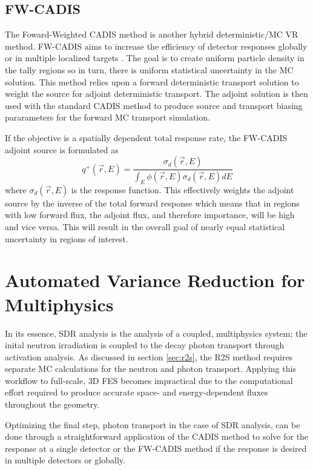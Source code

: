 \subsection{FW-CADIS}
The Foward-Weighted CADIS method is another hybrid deterministic/MC VR method.
FW-CADIS aims to increase the efficiency of 
detector responses globally or in multiple localized targets \cite{fwcadis}.
The goal is to create uniform particle density in the tally regions so in turn,
there is uniform statistical uncertainty in the MC solution.
This method relies upon a forward deterministic transport solution to
weight the source for adjoint deterministic transport.  The adjoint solution is
then used with the standard CADIS method to produce source and transport
biasing pararameters for the forward MC transport simulation.

If the objective is a spatially dependent total response rate, the FW-CADIS 
adjoint source is formulated as
\begin{equation}
	q^{+}(\overrightarrow{r}, E) = \frac{\sigma_d(\overrightarrow{r}, E)}
	{\int_E
	 {\phi(\overrightarrow{r}, E)\sigma_d(\overrightarrow{r}, E)} dE}
\end{equation}
where $\sigma_d(\overrightarrow{r}, E) $ is the response function.
This effectively weights the adjoint source by the inverse of %
the total forward response
which means that in regions with low forward flux, the adjoint flux, and therefore
importance, will be high and vice versa.  This will result in the overall goal of
nearly equal statistical uncertainty in regions of interest.  

\section{Automated Variance Reduction for Multiphysics}\label{sec:auto_vr_sdr}

In its essence, SDR analysis is the analysis of a coupled, multiphysics system;
the inital neutron irradiation is coupled to the decay photon transport
through activation analysis.
As discussed in section \ref{sec:r2s}, the R2S method requires separate MC calculations 
for the neutron and photon transport.
Applying this workflow to full-scale, 3D FES becomes impractical 
due to the computational effort required
to produce accurate space- and energy-dependent fluxes throughout the geometry.

Optimizing the final step, photon transport in the case of SDR analysis,  
can be done through a straightforward application of the CADIS method to solve 
for the response at a single detector or the FW-CADIS method if the response is desired
in multiple detectors or globally. 

